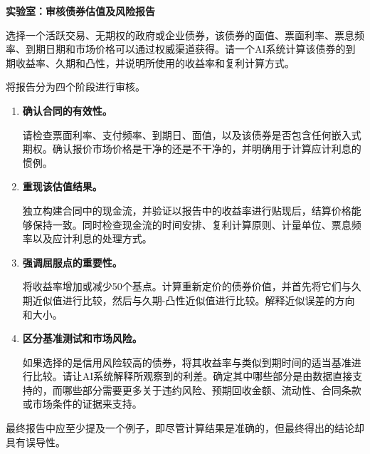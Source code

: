 

\textbf{实验室：审核债券估值及风险报告}

选择一个活跃交易、无期权的政府或企业债券，该债券的面值、票面利率、票息频率、到期日期和市场价格可以通过权威渠道获得。请一个AI系统计算该债券的到期收益率、久期和凸性，并说明所使用的收益率和复利计算方式。

将报告分为四个阶段进行审核。

\begin{enumerate}

\item \textbf{确认合同的有效性。}

请检查票面利率、支付频率、到期日、面值，以及该债券是否包含任何嵌入式期权。确认报价市场价格是干净的还是不干净的，并明确用于计算应计利息的惯例。

\item \textbf{重现该估值结果。}

独立构建合同中的现金流，并验证以报告中的收益率进行贴现后，结算价格能够保持一致。同时检查现金流的时间安排、复利计算原则、计量单位、票息频率以及应计利息的处理方式。

\item \textbf{强调屈服点的重要性。}

将收益率增加或减少50个基点。计算重新定价的债券价值，并首先将它们与久期近似值进行比较，然后与久期-凸性近似值进行比较。解释近似误差的方向和大小。

\item \textbf{区分基准测试和市场风险。}

如果选择的是信用风险较高的债券，将其收益率与类似到期时间的适当基准进行比较。请让AI系统解释所观察到的利差。确定其中哪些部分是由数据直接支持的，而哪些部分需要更多关于违约风险、预期回收金额、流动性、合同条款或市场条件的证据来支持。

\end{enumerate}

最终报告中应至少提及一个例子，即尽管计算结果是准确的，但最终得出的结论却具有误导性。



